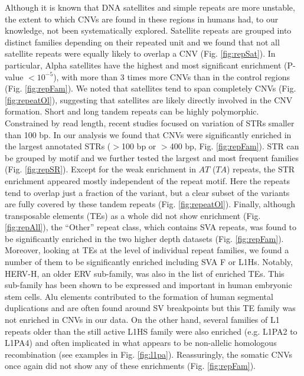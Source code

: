 Although it is known that DNA satellites and simple repeats are more unstable\cite{Eckert2009}, the extent to which CNVs are found in these regions in humans had, to our knowledge, not been systematically explored.
Satellite repeats are grouped into distinct families depending on their repeated unit and we found that not all satellite repeats were equally likely to overlap a CNV (Fig. \ref{fig:repSat}).
In particular, Alpha satellites have the highest and most significant enrichment (P-value $<10^{-5}$), with more than 3 times more CNVs than in the control regions (Fig. \ref{fig:repFam}).
We noted that satellites tend to span completely CNVs (Fig. \ref{fig:repeatOl}), suggesting that satellites are likely directly involved in the CNV formation.
Short and long tandem repeats can be highly polymorphic\cite{Gymrek2012,Warburton2008}.
Constrained by read length, recent studies\cite{Willems2014,Fungtammasan2015} focused on variation of STRs smaller than 100 bp.
In our analysis we found that CNVs were significantly enriched in the largest annotated STRs ($>$100 bp or $>$400 bp, Fig. \ref{fig:repFam}).
STR can be grouped by motif and we further tested the largest and most frequent families (Fig. \ref{fig:repSR}).
Except for the weak enrichment in $AT$ ($TA$) repeats, the STR enrichment appeared mostly independent of the repeat motif.
Here the repeats tend to overlap just a fraction of the variant, but a clear subset of the variants are fully covered by these tandem repeats (Fig. \ref{fig:repeatOl}).
Finally, although transposable elements (TEs) as a whole did not show enrichment (Fig. \ref{fig:repAll}), the ``Other'' repeat class, which contains SVA repeats, was found to be significantly enriched in the two higher depth datasets (Fig. \ref{fig:repFam}). Moreover, looking at TEs at the level of individual repeat families, we found a number of them to be significantly enriched including SVA F or L1Hs.
Notably, HERV-H, an older ERV sub-family, was also in the list of enriched TEs.
This sub-family has been shown to be expressed and important in human embryonic stem cells\cite{Kelley2012,Lu2014}.
Alu elements contributed to the formation of human segmental duplications\cite{Bailey2003} and are often found around SV breakpoints\cite{Kidd2010} but this TE family was not enriched in CNVs in our data.
On the other hand, several families of L1 repeats older than the still active L1HS family were also enriched (e.g. L1PA2 to L1PA4) and often implicated in what appears to be non-allelic homologous recombination (see examples in Fig. \ref{fig:l1pa}).
Reassuringly, the somatic CNVs once again did not show any of these enrichments (Fig. \ref{fig:repFam}).

